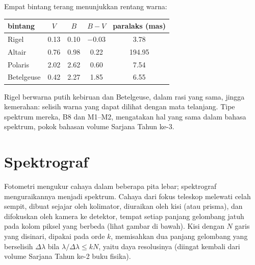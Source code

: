 Empat bintang terang menunjukkan rentang warna:
\begin{center}
\small
\begin{tabular}{lcccc}
\hline
bintang & $V$ & $B$ & $B - V$ & paralaks (\unit{mas}) \\
\hline
Rigel & 0.13 & 0.10 & $-0.03$ & 3.78 \\
Altair & 0.76 & 0.98 & 0.22 & 194.95 \\
Polaris & 2.02 & 2.62 & 0.60 & 7.54 \\
Betelgeuse & 0.42 & 2.27 & 1.85 & 6.55 \\
\hline
\end{tabular}
\end{center}
Rigel berwarna putih kebiruan dan Betelgeuse, dalam rasi yang sama, jingga kemerahan: selisih warna yang dapat dilihat dengan mata telanjang. Tipe spektrum mereka, B8 dan M1--M2, mengatakan hal yang sama dalam bahasa spektrum, pokok bahasan volume Sarjana Tahun ke-3.

\section{Spektrograf}

Fotometri mengukur cahaya dalam beberapa pita lebar; spektrograf menguraikannya menjadi spektrum. Cahaya dari fokus teleskop melewati celah sempit, dibuat sejajar oleh kolimator, diuraikan oleh kisi (atau prisma), dan difokuskan oleh kamera ke detektor, tempat setiap panjang gelombang jatuh pada kolom piksel yang berbeda
(lihat gambar di bawah). Kisi dengan $N$ garis yang disinari, dipakai pada orde $k$, memisahkan dua panjang gelombang yang berselisih $\Delta\lambda$ bila $\lambda/\Delta\lambda \le kN$, yaitu daya resolusinya (diingat kembali dari volume Sarjana Tahun ke-2 buku fisika).

